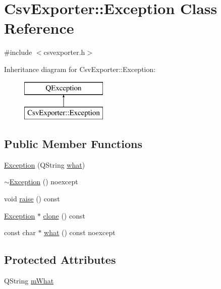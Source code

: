 \hypertarget{class_csv_exporter_1_1_exception}{}\section{Csv\+Exporter\+::Exception Class Reference}
\label{class_csv_exporter_1_1_exception}


{\ttfamily \#include $<$csvexporter.\+h$>$}

Inheritance diagram for Csv\+Exporter\+::Exception\+:\begin{figure}[H]
\begin{center}
\leavevmode
\includegraphics[height=2.000000cm]{d7/d92/class_csv_exporter_1_1_exception}
\end{center}
\end{figure}
\subsection*{Public Member Functions}
\begin{DoxyCompactItemize}
\item 
\mbox{\hyperlink{class_csv_exporter_1_1_exception_abee479e763996902c221be5ec7144bd1}{Exception}} (Q\+String \mbox{\hyperlink{class_csv_exporter_1_1_exception_a76221db8a95aa98e5a5e1b03bebef637}{what}})
\item 
\mbox{\hyperlink{class_csv_exporter_1_1_exception_a25358bce0280bef2dade77a27fba8c3e}{$\sim$\+Exception}} () noexcept
\item 
void \mbox{\hyperlink{class_csv_exporter_1_1_exception_a548456f0559a59547176e3d9117efbd6}{raise}} () const
\item 
\mbox{\hyperlink{class_csv_exporter_1_1_exception}{Exception}} $\ast$ \mbox{\hyperlink{class_csv_exporter_1_1_exception_a47969083d6906ad406536f425255e198}{clone}} () const
\item 
const char $\ast$ \mbox{\hyperlink{class_csv_exporter_1_1_exception_a76221db8a95aa98e5a5e1b03bebef637}{what}} () const noexcept
\end{DoxyCompactItemize}
\subsection*{Protected Attributes}
\begin{DoxyCompactItemize}
\item 
Q\+String \mbox{\hyperlink{class_csv_exporter_1_1_exception_a74f7d1e6b040ca280efb1572e55de7bf}{m\+What}}
\end{DoxyCompactItemize}


